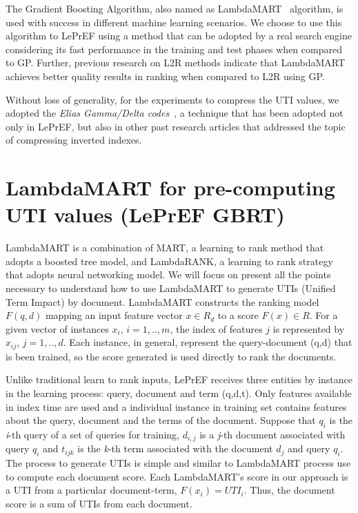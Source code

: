 \documentclass[preprint,12pt,3p]{elsarticle}
\begin{document}
The Gradient Boosting Algorithm, also named as  LambdaMART~\cite{wu2010lambdamart} algorithm, is used with success in different machine learning scenarios. We choose to use this algorithm to LePrEF using a method that can be adopted by a real search engine considering its fast performance in the training and test phases when compared  to GP. Further,  previous research on L2R methods indicate that LambdaMART achieves  better quality results in ranking  when compared to L2R using GP. 


Without loss of generality, for the experiments to compress the UTI values, we adopted the \textit{Elias Gamma/Delta codes}~\cite{elias1975universal}, a technique that has been adopted not only in LePrEF, but also in other past research articles that addressed the topic of compressing inverted indexes. 

\section{LambdaMART for pre-computing UTI values (LePrEF GBRT)}
\label{lambda}

LambdaMART \cite{wu2010lambdamart} is a combination of MART, a learning to rank method that adopts a boosted tree model, and LambdaRANK, a learning to rank strategy that adopts neural networking model. We will focus on present all the points necessary to understand how to use LambdaMART to generate UTIs (Unified Term Impact) by document. LambdaMART constructs the ranking model $F(q,d)$ mapping an input feature vector $x \in R_d$ to a score $F(x) \in R$. For a given vector of instances $x_i$, $i=1,..,m$, the index of features $j$ is represented by $x_{ij}$, $j=1,..,d$. Each instance, in general, represent the query-document (q,d) that is been trained, so the score generated is used directly to rank the documents.
 
Unlike traditional learn to rank inputs, LePrEF receives three entities by instance in the learning process: query, document and term (q,d,t). Only features available in index time are used and a individual instance in training set contains features about the query, document and the terms of the document. Suppose that $q_i$ is the \textit{i}-th query of a set of queries for training, $d_{i,j}$ is a \textit{j}-th document associated with query $q_i$ and $t_{ijk}$ is the \textit{k}-th term associated with the document $d_j$ and query $q_i$. The process to generate UTIs is simple and similar to LambdaMART process use to compute each document score. Each LambdaMART's score in our approach is a UTI from a particular document-term, $F(x_i) = UTI_i$. Thus, the document score is a sum of UTIs from each document. 
\end{document}
